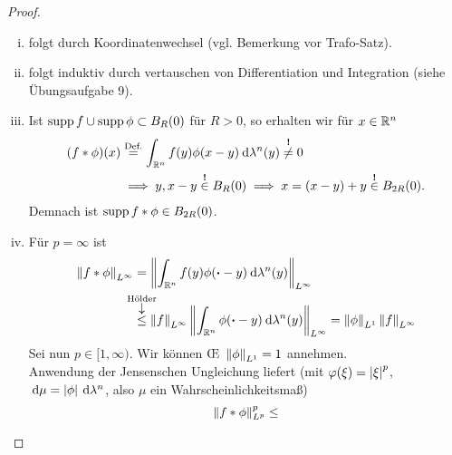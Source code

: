 \documentclass[skript.tex]{subfiles}
\begin{document}
	\begin{proof}
		\hfill
		\begin{enumerate}[(i)]
			\item folgt durch Koordinatenwechsel (vgl. Bemerkung vor Trafo-Satz).
			
			\item folgt induktiv durch vertauschen von Differentiation und Integration (siehe Übungsaufgabe 9).
			
			\item Ist $\operatorname{supp} f \cup \operatorname{supp} \phi \subset B_R(0)$ für $R > 0$, so erhalten wir für $x \in \mathbb{R}^n$
			\begin{align*}
				(f \ast \phi)(x) &\overset{\text{Def.}}{=} \int_{\mathbb{R}^n} f(y)\phi(x-y)\: \mathrm{d}\lambda^n(y) \overset{\boldsymbol !}{\neq} 0 \\
				&\implies y,x-y \overset{\boldsymbol !}{\in} B_R(0) \implies x = (x-y)+y \overset{\boldsymbol !}{\in} B_{2R}(0).
			\end{align*}
			Demnach ist $\operatorname{supp} f\ast\phi \in B_{2R}(0)$.
			
			\item Für $p=\infty$ ist
			\begin{align*}
				\norm{f\ast\phi}_{L^\infty} &= \norm{\int_{\mbb{R}^n} f(y) \phi(\bcdot-y) \md\lambda^n(y)}_{L^\infty} \\ &\darrow{\text{Hölder}}{\leq} \norm{f}_{L^\infty} \norm{\int_{\mbb{R}^n}\phi(\bcdot-y) \md\lambda^n(y)}_{L^\infty} = \norm{\phi}_{L^1}\norm{f}_{L^\infty}
			\end{align*}
			Sei nun $p \in [1,\infty)$. Wir können \OE\  $\left\lVert \phi \right\rVert_{L^1} = 1$ annehmen.\\
			Anwendung der Jensenschen Ungleichung liefert (mit $\varphi(\xi) = \left| \xi \right|^p$, $\: \mathrm{d}\mu=\left| \phi \right|\: \mathrm{d}\lambda^n$, also $\mu$ ein Wahrscheinlichkeitsmaß)
			\[
				\left\lVert f\ast\phi \right\rVert_{L^p}^p \leq 
			\]
		\end{enumerate}
	\end{proof}
	
\end{document}

